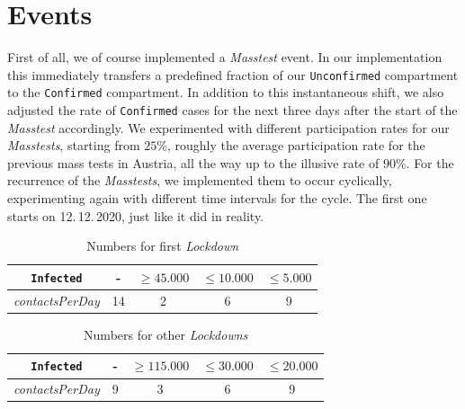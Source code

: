 \documentclass
[
    report,
    11pt,
    bibliography = totoc,
    listof = totoc,
    headinclude = true,
]
{scrreport}
\begin{document}
\section{Events}

First of all, we of course implemented a \textit{Masstest} event. In our implementation
this immediately transfers a predefined fraction of our \texttt{Unconfirmed} compartment
to the \texttt{Confirmed} compartment. In addition to this instantaneous shift, we also
adjusted the rate of \texttt{Confirmed} cases for the next three days after the start of
the \textit{Masstest} accordingly. We experimented with different participation rates
for our \textit{Masstests}, starting from $25\%$, roughly the average participation rate
for the previous mass tests in Austria, all the way up to the illusive rate of $90\%$.
For the recurrence of the \textit{Masstests}, we implemented them to occur cyclically,
experimenting again with different time intervals for the cycle. The first one
starts on 12.\,12.\,2020, just like it did in reality.\\

\begin{table}[!h]
  \begin{center}
  \begin{tabular}{|c||c|c|c|c|}
  \hline
    \texttt{Infected} &- & $\geq 45.000$ & $\leq 10.000$ & $\leq 5.000$ \\
    \hline
    \textit{contactsPerDay} & 14 & 2 & 6 & 9 \\
    \hline
  \end{tabular}
  \end{center}
  \caption{Numbers for first \textit{Lockdown}}
\end{table}

\begin{table}[!h]
  \begin{center}
  \begin{tabular}{|c||c|c|c|c|}
  \hline
    \texttt{Infected} &- & $\geq 115.000$ & $\leq 30.000$ & $\leq 20.000$ \\
    \hline
    \textit{contactsPerDay} & 9 & 3 & 6 & 9 \\
    \hline
  \end{tabular}
  \end{center}
  \caption{Numbers for other \textit{Lockdowns}}
\end{table}
\end{document}
